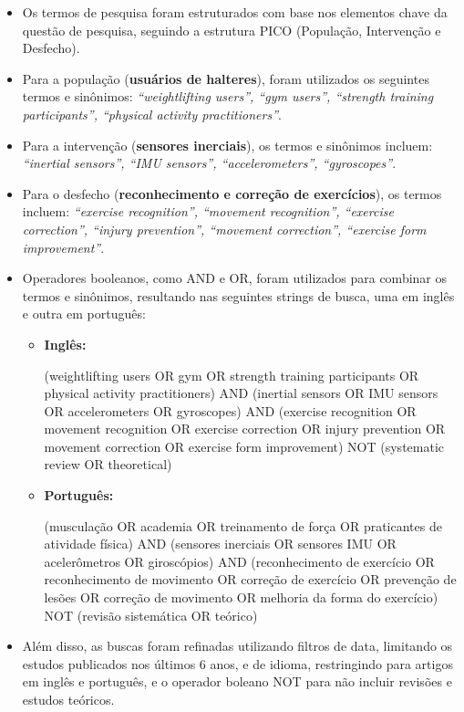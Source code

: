 \documentclass[conference]{IEEEtran}
\begin{document}
\begin{itemize}
    \item Os termos de pesquisa foram estruturados com base nos elementos chave da questão de pesquisa, seguindo a estrutura PICO (População, Intervenção e Desfecho).
    
    \item Para a população (\textbf{usuários de halteres}), foram utilizados os seguintes termos e sinônimos: \textit{“weightlifting users”, “gym users”, “strength training participants”, “physical activity practitioners”}.
    
    \item Para a intervenção (\textbf{sensores inerciais}), os termos e sinônimos incluem: \textit{“inertial sensors”, “IMU sensors”, “accelerometers”, “gyroscopes”}.
    
    \item Para o desfecho (\textbf{reconhecimento e correção de exercícios}), os termos incluem: \textit{“exercise recognition”, “movement recognition”, “exercise correction”, “injury prevention”, “movement correction”, “exercise form improvement”}.
    
    \item Operadores booleanos, como AND e OR, foram utilizados para combinar os termos e sinônimos, resultando nas seguintes strings de busca, uma em inglês e outra em português:
    
    \begin{itemize}
        \item \textbf{Inglês:} \newline
        \begin{RaggedRight}
        (weightlifting users OR gym OR strength training participants OR physical activity practitioners) AND (inertial sensors OR IMU sensors OR accelerometers OR gyroscopes) AND (exercise recognition OR movement recognition OR exercise correction OR injury prevention OR movement correction OR exercise form improvement) NOT (systematic review OR theoretical)
        \end{RaggedRight}
        
        \item \textbf{Português:} 
        \begin{RaggedRight}
        (musculação OR academia OR treinamento de força OR praticantes de atividade física) AND (sensores inerciais OR sensores IMU OR acelerômetros OR giroscópios) AND (reconhecimento de exercício OR reconhecimento de movimento OR correção de exercício OR prevenção de lesões OR correção de movimento OR melhoria da forma do exercício) NOT (revisão sistemática OR teórico)
        \end{RaggedRight}
    \end{itemize}
    
    \item Além disso, as buscas foram refinadas utilizando filtros de data, limitando os estudos publicados nos últimos 6 anos, e de idioma, restringindo para artigos em inglês e português, e o operador boleano NOT para não incluir revisões e estudos teóricos.
\end{itemize}
\end{document}

